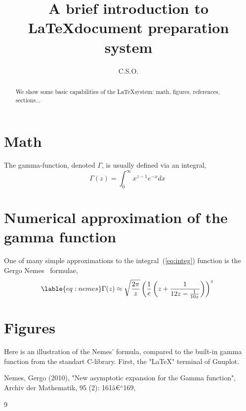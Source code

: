 \documentclass{article}
\title{A brief introduction to \LaTeX document preparation system}
\author{C.S.O.}
\date{}
\begin{document}
\maketitle
\begin{abstract}
	We show some basic capabilities of the \LaTeX system: math, figures, references, sections...
\end{abstract}
\section{Math}
The gamma-function, denoted $\Gamma$, is usually defined via an integral,
	\begin{equation}\label{eq:integ}
\Gamma(z)=\int_0^\infty x^{z-1}e^{-x} dx\;
	\end{equation}

\section{Numerical approximation of the gamma function}
One of many simple approximations to the integral~(\ref{eq:integ}) function is the Gergo Nemes~\cite{gergo-nemes} formulae,
	\begin{equation}\lable{eq:nemes}
\Gamma(z) \approx \sqrt{\frac{2\pi}{z} } \left(\frac{1}{e} \left(z +
\frac{1}{12z - \frac{1}{10z}}\right)\right)^z \;
	\end{equation}

\section{Figures}
Here is an illustration of the Nemes' formula, compared to the built-in gamma function from the standart C-library. First, the "\LaTeX" terminal of Gnuplot.
	\begin{figure}

	\end{figure}


\begin{thebibliography}{9}
 Nemes, Gergo (2010), "New asymptotic expansion
for the Gamma function", Archiv der Mathematik, 95 (2): 161â€“169,
\end{thebibliography}{9}
\end{document}

